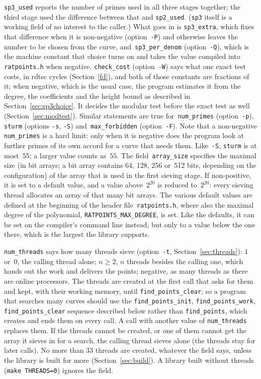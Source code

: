 \documentclass[12pt,a4paper,oneside]{amsart}
\begin{document}
\texttt{sp3\_used}
reports the number of primes used in all three stages together; the third
stage used the difference between that and \texttt{sp2\_used}.
(\texttt{sp3} itself is a working field of no interest to the caller.)
What goes in is \texttt{sp3\_extra}, which fixes that difference when
it is non-negative (option~\verb+-P+) and otherwise leaves the number to be
chosen from the curve, and~\texttt{sp3\_per\_denom} (option~\verb+-Q+),
which is the machine constant that choice turns on and takes the value
compiled into \texttt{ratpoints.h} when negative. \texttt{check\_cost}
(option~\verb+-W+) says what one exact test costs, in rdtsc cycles
(Section~\ref{fd}), and both
of those constants are fractions of it; when negative, which is the usual
case, the program estimates it from the degree, the coefficients and the
height bound as described in Section~\ref{sec:sp3choice}. It decides the
modular test before the exact test as well (Section~\ref{sec:modtest}).
Similar statements are true for~\texttt{num\_primes} (option~\verb+-p+),
\texttt{sturm} (options \verb+-s+, \verb+-S+) and~\texttt{max\_forbidden}
(option~\verb+-F+). Note that a non-negative \texttt{num\_primes} is a hard
limit: only when it is negative does the program look at further primes of
its own accord for a curve that needs them. Like~\verb+-S+, \texttt{sturm}
is at most~$55$; a larger value counts as~$55$. The field~\texttt{array\_size} specifies the maximal size
(in bit arrays; a bit array
contains 64, 128, 256 or~512 bits, depending on the configuration) of the
array that is used in the first sieving stage. If non-positive, it is
set to a default value, and a value above~$2^{20}$ is reduced to~$2^{20}$:
every sieving thread allocates an array of that many bit arrays. The various
default values are defined at the beginning of the header
file~\texttt{ratpoints.h}, where also the maximal degree of the polynomial,
\texttt{RATPOINTS\_MAX\_DEGREE}, is set. Like the defaults, it can be set
on the compiler's command line instead, but only to a value below the one
there, which is the largest the library supports.

\texttt{num\_threads} says how many threads sieve (option~\verb+-t+,
Section~\ref{sec:threads}): $1$ or~$0$, the calling thread alone; $n \ge 2$,
$n$ threads besides the calling one, which hands out the work and delivers
the points; negative, as many threads as there are online processors. The
threads are created at the first call that asks for them and kept, with
their working memory, until \texttt{find\_points\_clear}; so a program
that searches many curves should use the \texttt{find\_points\_init},
\texttt{find\_points\_work}, \texttt{find\_points\_clear} sequence
described below rather than \texttt{find\_points}, which creates and ends
them on every call. A call with another value of \texttt{num\_threads}
replaces them. If the threads cannot be created, or one of them cannot get
the array it sieves in for a search, the calling thread sieves alone (the
threads stay for later calls). No more than $33$ threads are created,
whatever the field says,
unless the library is built for more (Section~\ref{sec:build}). A library
built without threads (\texttt{make THREADS=0}) ignores the field.
\end{document}
